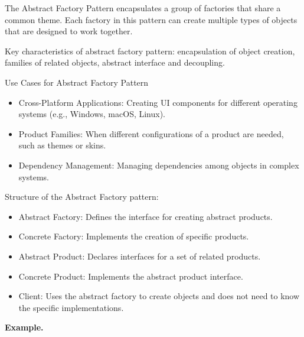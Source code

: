 The Abstract Factory Pattern encapsulates a group of factories that share a common theme. Each factory in this pattern can create multiple types of objects that are designed to work together.

Key characteristics of abstract factory pattern: encapsulation of object creation, families of related objects, abstract interface and decoupling.

Use Cases for Abstract Factory Pattern

\begin{itemize}
\item Cross-Platform Applications: Creating UI components for different operating systems (e.g., Windows, macOS, Linux).

\item Product Families: When different configurations of a product are needed, such as themes or skins.

\item Dependency Management: Managing dependencies among objects in complex systems.
\end{itemize}

Structure of the Abstract Factory pattern:

\begin{itemize}
\item Abstract Factory: Defines the interface for creating abstract products.

\item Concrete Factory: Implements the creation of specific products.

\item Abstract Product: Declares interfaces for a set of related products.

\item Concrete Product: Implements the abstract product interface.

\item Client: Uses the abstract factory to create objects and does not need to know the specific implementations.
\end{itemize}


\textbf{Example.}

